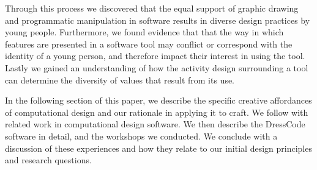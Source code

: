 \documentclass{sigchi}
\begin{document}
Through this process we discovered that the equal support of graphic drawing and programmatic manipulation in software results in diverse design practices by young people. Furthermore, we found evidence that that the way in which features are presented in a software tool may conflict or correspond with the identity of a young person, and therefore impact their interest in using the tool. Lastly we gained an understanding of how the activity design surrounding a tool can determine the diversity of values that result from its use.%

In the following section of this paper, we describe the specific creative affordances of computational design and our rationale in applying it to craft. We follow with related work in computational design software. We then describe the DressCode software in detail, and the workshops we conducted. We conclude with a discussion of these experiences and how they relate to our initial design principles and research questions. 
\end{document}
